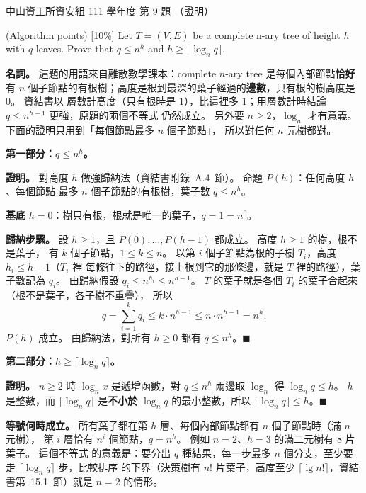 \begin{pastexam}[label={px:nsysu-111-dmalg-06}]{中山資工所資安組 111 學年度 第 9 題}
（證明）

(Algorithm points) {[10\%]} Let $T=(V,E)$ be a complete n-ary tree of height $h$ with $q$ leaves.
Prove that $q\le n^h$ and $h\ge\lceil\log_n q\rceil$.
\end{pastexam}

\begin{pastsoln}
\textbf{名詞。} 這題的用語來自離散數學課本：complete $n$-ary tree 是每個內部節點\textbf{恰好}有
$n$ 個子節點的有根樹；高度是根到最深的葉子經過的\textbf{邊數}，只有根的樹高度是 $0$。 資結書以
層數計高度（只有根時是 $1$），比這裡多 $1$；用層數計時結論 $q \le n^{h-1}$ 更強，原題的兩個不等式
仍然成立。 另外要 $n \ge 2$，$\log_n$ 才有意義。 下面的證明只用到「每個節點最多 $n$ 個子節點」，
所以對任何 $n$ 元樹都對。

\textbf{第一部分：$q \le n^h$。}

\textbf{證明。} 對高度 $h$ 做強歸納法（資結書附錄~A.4~節）。 命題 $P(h)$：任何高度 $h$、每個節點
最多 $n$ 個子節點的有根樹，葉子數 $q \le n^h$。

\textbf{基底} $h = 0$：樹只有根，根就是唯一的葉子，$q = 1 = n^0$。

\textbf{歸納步驟。} 設 $h \ge 1$，且 $P(0), \ldots, P(h-1)$ 都成立。 高度 $h \ge 1$ 的樹，根不是葉子，
有 $k$ 個子節點，$1 \le k \le n$。 以第 $i$ 個子節點為根的子樹 $T_i$，高度 $h_i \le h - 1$（$T_i$ 裡
每條往下的路徑，接上根到它的那條邊，就是 $T$ 裡的路徑），葉子數記為 $q_i$。 由歸納假設
$q_i \le n^{h_i} \le n^{h-1}$。 $T$ 的葉子就是各個 $T_i$ 的葉子合起來（根不是葉子，各子樹不重疊），
所以
\[
q = \sum_{i=1}^{k} q_i \le k \cdot n^{h-1} \le n \cdot n^{h-1} = n^h .
\]
$P(h)$ 成立。 由歸納法，對所有 $h \ge 0$ 都有 $q \le n^h$。\hfill$\blacksquare$

\textbf{第二部分：$h \ge \lceil \log_n q \rceil$。}

\textbf{證明。} $n \ge 2$ 時 $\log_n x$ 是遞增函數，對 $q \le n^h$ 兩邊取 $\log_n$ 得 $\log_n q \le h$。
$h$ 是整數，而 $\lceil \log_n q \rceil$ 是\textbf{不小於} $\log_n q$ 的最小整數，所以
$\lceil \log_n q \rceil \le h$。\hfill$\blacksquare$

\textbf{等號何時成立。} 所有葉子都在第 $h$ 層、每個內部節點都有 $n$ 個子節點時（滿 $n$ 元樹），
第 $i$ 層恰有 $n^i$ 個節點，$q = n^h$。 例如 $n = 2$、$h = 3$ 的滿二元樹有 $8$ 片葉子。 這個不等式
的意義是：要分出 $q$ 種結果，每一步最多 $n$ 個分支，至少要走 $\lceil \log_n q \rceil$ 步，比較排序
的下界（決策樹有 $n!$ 片葉子，高度至少 $\lceil \lg n! \rceil$，資結書第~15.1~節）就是 $n = 2$ 的情形。
\end{pastsoln}
